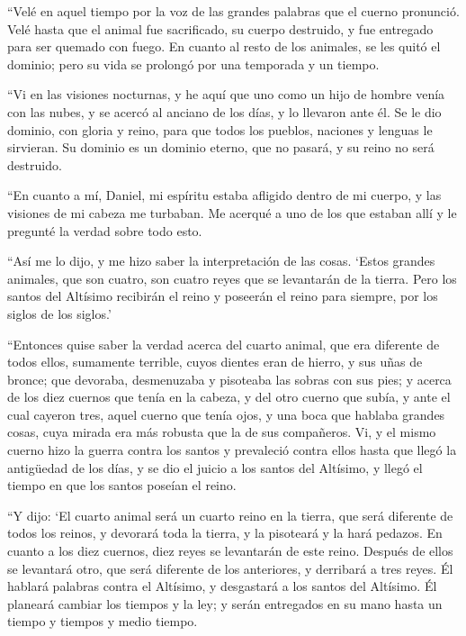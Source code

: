  ``Velé en aquel tiempo por la voz de las grandes
palabras que el cuerno pronunció. Velé hasta que el animal fue
sacrificado, su cuerpo destruido, y fue entregado para ser quemado con
fuego.  En cuanto al resto de los animales, se les quitó
el dominio; pero su vida se prolongó por una temporada y un tiempo.

 ``Vi en las visiones nocturnas, y he aquí que uno como
un hijo de hombre venía con las nubes, y se acercó al anciano de los
días, y lo llevaron ante él.  Se le dio dominio, con
gloria y reino, para que todos los pueblos, naciones y lenguas le
sirvieran. Su dominio es un dominio eterno, que no pasará, y su reino no
será destruido.

 ``En cuanto a mí, Daniel, mi espíritu estaba afligido
dentro de mi cuerpo, y las visiones de mi cabeza me turbaban.
 Me acerqué a uno de los que estaban allí y le pregunté
la verdad sobre todo esto.

``Así me lo dijo, y me hizo saber la interpretación de las cosas.
 `Estos grandes animales, que son cuatro, son cuatro
reyes que se levantarán de la tierra.  Pero los santos
del Altísimo recibirán el reino y poseerán el reino para siempre, por
los siglos de los siglos.'

 ``Entonces quise saber la verdad acerca del cuarto
animal, que era diferente de todos ellos, sumamente terrible, cuyos
dientes eran de hierro, y sus uñas de bronce; que devoraba, desmenuzaba
y pisoteaba las sobras con sus pies;  y acerca de los
diez cuernos que tenía en la cabeza, y del otro cuerno que subía, y ante
el cual cayeron tres, aquel cuerno que tenía ojos, y una boca que
hablaba grandes cosas, cuya mirada era más robusta que la de sus
compañeros.  Vi, y el mismo cuerno hizo la guerra contra
los santos y prevaleció contra ellos  hasta que llegó la
antigüedad de los días, y se dio el juicio a los santos del Altísimo, y
llegó el tiempo en que los santos poseían el reino.

 ``Y dijo: `El cuarto animal será un cuarto reino en la
tierra, que será diferente de todos los reinos, y devorará toda la
tierra, y la pisoteará y la hará pedazos.  En cuanto a
los diez cuernos, diez reyes se levantarán de este reino. Después de
ellos se levantará otro, que será diferente de los anteriores, y
derribará a tres reyes.  Él hablará palabras contra el
Altísimo, y desgastará a los santos del Altísimo. Él planeará cambiar
los tiempos y la ley; y serán entregados en su mano hasta un tiempo y
tiempos y medio tiempo.

